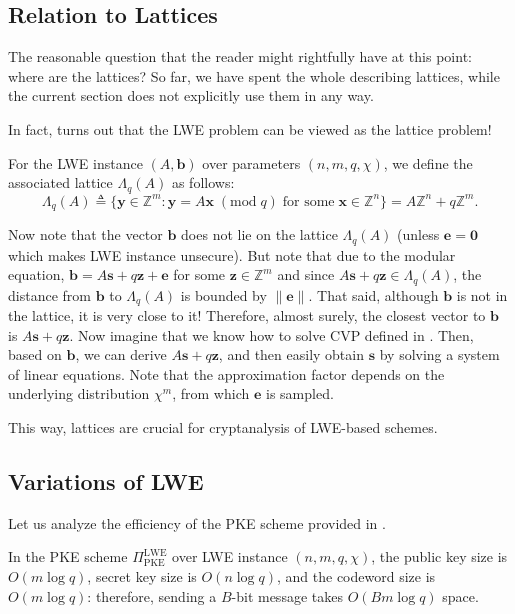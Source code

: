 \documentclass{template}
\begin{document}
\subsection{Relation to Lattices}

The reasonable question that the reader might rightfully have at this point:
where are the lattices? So far, we have spent the whole 
describing lattices, while the current section does not explicitly use them in
any way.

In fact, turns out that the LWE problem can be viewed as the lattice problem!

\begin{definition}
    For the LWE instance $(A,\mathbf{b})$ over parameters $(n,m,q,\chi)$, we
    define the associated lattice $\Lambda_q(A)$ as follows:
    \begin{equation*}
        \Lambda_q(A) \triangleq \{\mathbf{y} \in \mathbb{Z}^m: \mathbf{y} = A\mathbf{x} \; (\text{mod}\; q) \; \text{for some} \; \mathbf{x} \in \mathbb{Z}^n\} = A\mathbb{Z}^n + q\mathbb{Z}^m.
    \end{equation*}
\end{definition}

Now note that the vector $\mathbf{b}$ does not lie on the lattice $\Lambda_q(A)$
(unless $\mathbf{e}=\mathbf{0}$ which makes LWE instance unsecure). But note
that due to the modular equation, $\mathbf{b} = A\mathbf{s} + q\mathbf{z} +
\mathbf{e}$ for some $\mathbf{z} \in \mathbb{Z}^m$ and since $A\mathbf{s} +
q\mathbf{z} \in \Lambda_q(A)$, the distance from $\mathbf{b}$ to $\Lambda_q(A)$
is bounded by $\|\mathbf{e}\|$. That said, although $\mathbf{b}$ is not in the
lattice, it is very close to it! Therefore, almost surely, the closest vector to
$\mathbf{b}$ is $A\mathbf{s} + q\mathbf{z}$. Now imagine that we know how to
solve CVP defined in . Then, based on
$\mathbf{b}$, we can derive $A\mathbf{s}+q\mathbf{z}$, and then easily obtain
$\mathbf{s}$ by solving a system of linear equations. Note that the
approximation factor depends on the underlying distribution $\chi^m$, from which
$\mathbf{e}$ is sampled. 

This way, lattices are crucial for cryptanalysis of LWE-based schemes.

\subsection{Variations of LWE}

Let us analyze the efficiency of the PKE scheme provided in .
\begin{proposition}
    In the PKE scheme $\Pi_{\text{PKE}}^{\text{LWE}}$ over LWE instance
    $(n,m,q,\chi)$, the public key size is $O(m\log q)$, secret key size is
    $O(n\log q)$, and the codeword size is $O(m\log q)$: therefore, sending a
    $B$-bit message takes $O(B m \log q)$ space.
\end{proposition}
\end{document}

